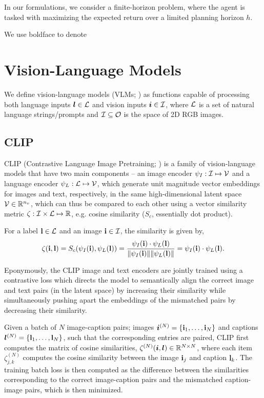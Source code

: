 In our formulations, we consider a finite-horizon problem, where the agent is tasked with maximizing the expected return over a limited planning horizon \(h\).

We use boldface to denote 

\newpage
\section{Vision-Language Models}
\label{sec:vlms}

We define vision-language models (VLMs; \cite{vlmsurvey}) as functions capable of processing both language inputs \(\bm{l} \in \mathcal{L}\) and vision inputs \(\bm{i} \in \mathcal{I}\), where \(\mathcal{L}\) is a set of natural language strings/prompts and \(\mathcal{I} \subseteq \mathcal{O}\) is the space of 2D RGB images.

\subsection{CLIP}
\label{sec:clip}
CLIP (Contrastive Language Image Pretraining; \cite{clip}) is a family of vision-language models that have two main components -- an image encoder \(\psi_I: \mathcal{I} \mapsto \mathcal{V}\) and a language encoder \(\psi_L: \mathcal{L} \mapsto \mathcal{V}\), which generate unit magnitude vector embeddings for images and text, respectively, in the same high-dimensional latent space \(\mathcal{V} \in \mathbb{R}^{n_v}\), which can thus be compared to each other using a vector similarity metric \(\zeta: \mathcal{I} \times \mathcal{L} \mapsto \mathbb{R}\), e.g. cosine similarity (\(S_c\), essentially dot product).

For a label \(\mathbf{l} \in \mathcal{L}\) and an image \(\mathbf{i} \in \mathcal{I}\), the similarity is given by,
\begin{equation}
    \label{eq:clip-similarity}
    \zeta(\mathbf{i}, \mathbf{l}) = S_c(\psi_I(\mathbf{i}), \psi_L(\mathbf{l})) = \dfrac{\psi_I(\mathbf{i}) \cdot \psi_L(\mathbf{l})}{\| \psi_I(\mathbf{i}) \| \| \psi_L(\mathbf{l}) \|} = \psi_I(\mathbf{i}) \cdot \psi_L(\mathbf{l}).
\end{equation}

Eponymously, the CLIP image and text encoders are jointly trained using a contrastive loss which directs the model to semantically align the correct image and text pairs (in the latent space) by increasing their similarity while simultaneously pushing apart the embeddings of the mismatched pairs by decreasing their similarity.

Given a batch of \(N\) image-caption pairs; images \(\bm{i}^{(N)} = \{ \mathbf{i}_1, \dots, \mathbf{i}_N \}\) and captions \(\bm{l}^{(N)} = \{ \mathbf{l}_1, \dots, \mathbf{l}_N \}\), such that the corresponding entries are paired, CLIP first computes the matrix of cosine similarities, \(\zeta^{(N)}(\bm{i}, \bm{l}) \in \mathbb{R}^{N \times N}\), where each item \(\zeta^{(N)}_{j,k}\) computes the cosine similarity between the image \(\mathbf{i}_j\) and caption \(\mathbf{l}_k\).
The training batch loss is then computed as the difference between the similarities corresponding to the correct image-caption pairs and the mismatched caption-image pairs, which is then minimized.

